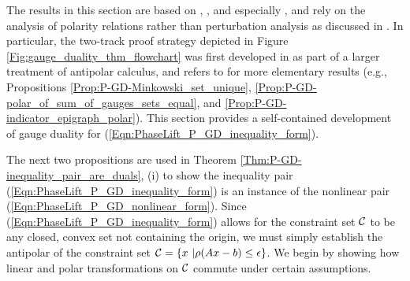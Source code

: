 The results in this section are based on \cite{rockafellar1970convex}, \cite{DBLP:journals/mp/Freund87}, and especially \cite{DBLP:journals/siamjo/FriedlanderMP14}, and rely on the analysis of polarity relations rather than perturbation analysis as discussed in \cite{aravkin2017foundations}.    In particular, the two-track proof strategy depicted in Figure \ref{Fig:gauge_duality_thm_flowchart} was first developed in \cite{DBLP:journals/siamjo/FriedlanderMP14} as part of a larger treatment of antipolar calculus, and refers to \cite{rockafellar1970convex} for more elementary results (e.g., Propositions \ref{Prop:P-GD-Minkowski_set_unique}, \ref{Prop:P-GD-polar_of_sum_of_gauges_sets_equal}, and \ref{Prop:P-GD-indicator_epigraph_polar}).  This section provides a self-contained development of gauge duality for (\ref{Eqn:PhaseLift_P_GD_inequality_form}).





The next two propositions are used in Theorem \ref{Thm:P-GD-inequality_pair_are_duals}, (i) to show the inequality pair (\ref{Eqn:PhaseLift_P_GD_inequality_form}) is an instance of the nonlinear pair (\ref{Eqn:PhaseLift_P_GD_nonlinear_form}).  Since (\ref{Eqn:PhaseLift_P_GD_inequality_form}) allows for the constraint set ${\mathcal C}$ to be any closed, convex set not containing the origin, we must simply establish the antipolar of the constraint set ${\mathcal C} = \{ x \ | \rho(Ax-b) \leq \epsilon\}$.  We begin by showing how linear and polar transformations on ${\mathcal C}$ commute under certain assumptions.





